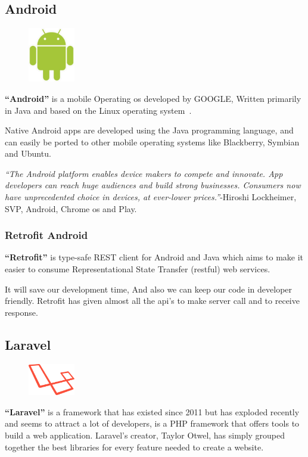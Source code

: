 \documentclass[12pt,a4paper]{report}
\begin{document}
	\subsection{Android}
	\begin{figure}
		\centering
		\includegraphics[width=0.8in]{android-logo.jpg}	
	\end{figure}
	\textbf{``Android''} is a mobile Operating \ac{os} developed by GOOGLE, Written primarily in Java and based on the Linux operating system~\cite{phillips2013android}.\par
	Native Android apps are developed using the Java programming language, and can easily be ported to other mobile operating systems like Blackberry, Symbian and Ubuntu.\par
	\textit{``The Android platform enables device makers to compete and innovate. App developers can reach huge audiences and build strong businesses. Consumers now have unprecedented choice in devices, at ever-lower prices.''}-Hiroshi Lockheimer, SVP, Android, Chrome \ac{os} and Play.
	\subsubsection*{Retrofit Android}
	\textbf{``Retrofit''} is type-safe REST client for Android and Java which aims to make it easier to consume Representational State Transfer (\ac{rest}ful) web services. \par 
	It will save our development time, And also we can keep our code in developer friendly. Retrofit has given almost all the \ac{api}'s to make server call and to receive response.

	\subsection{Laravel}
	\begin{figure}
		\centering
		\includegraphics[width=0.8in]{LaravelLogo.png}
	\end{figure}
	\textbf{``Laravel''} is a framework that has existed since 2011 but has exploded recently and seems to attract a lot of developers, is a PHP framework that offers tools to build a web application. Laravel's creator, Taylor Otwel, has simply grouped together the best libraries for every feature needed to create a website. \cite{laravelBook}
\end{document}
